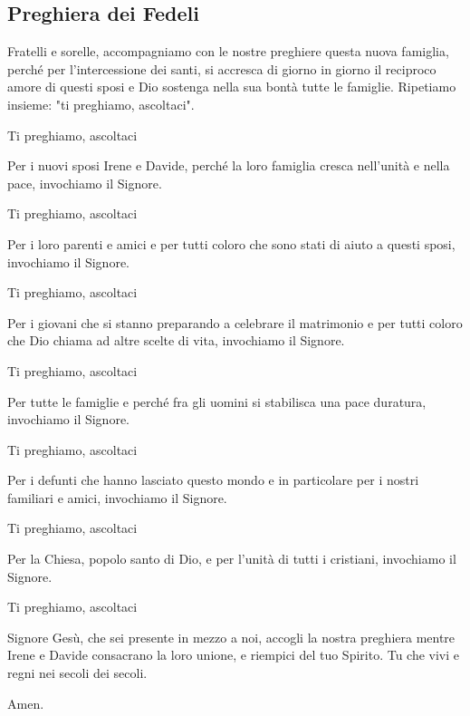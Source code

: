 
\subsection*{Preghiera dei Fedeli}

	\begin{dialoghi}
	\item[\sacerdote] Fratelli e sorelle, accompagniamo con le nostre preghiere questa nuova famiglia, perché per l'intercessione dei santi, si accresca di giorno in giorno il reciproco amore di questi sposi e Dio sostenga nella sua bontà tutte le famiglie. Ripetiamo insieme: "ti preghiamo, ascoltaci".
	\item[\assemblea] Ti preghiamo, ascoltaci
	\item[\lettore] Per i nuovi sposi Irene e Davide, perché la loro famiglia cresca nell'unità e nella pace, invochiamo il Signore.
	\item[\assemblea] Ti preghiamo, ascoltaci
	\item[\lettore] Per i loro parenti e amici e per tutti coloro che sono stati di aiuto a questi sposi, invochiamo il Signore.
	\item[\assemblea] Ti preghiamo, ascoltaci
	\item[\lettore] Per i giovani che si stanno preparando a celebrare il matrimonio e per tutti coloro che Dio chiama ad altre scelte di vita, invochiamo il Signore.
	\item[\assemblea] Ti preghiamo, ascoltaci
	\item[\lettore] Per tutte le famiglie e perché fra gli uomini si stabilisca una pace duratura, invochiamo il Signore.
	\item[\assemblea] Ti preghiamo, ascoltaci
	\item[\lettore] Per i defunti che hanno lasciato questo mondo e in particolare per i nostri familiari e amici, invochiamo il Signore.
	\item[\assemblea] Ti preghiamo, ascoltaci
	\item[\lettore] Per la Chiesa, popolo santo di Dio, e per l'unità di tutti i cristiani, invochiamo il Signore.
	\item[\assemblea] Ti preghiamo, ascoltaci
	\item[\sacerdote] Signore Gesù, che sei presente in mezzo a noi, accogli la nostra preghiera mentre Irene e Davide consacrano la loro unione, e riempici del tuo Spirito. Tu che vivi e regni nei secoli dei secoli.
	\item[\assemblea] Amen.
	\end{dialoghi}

